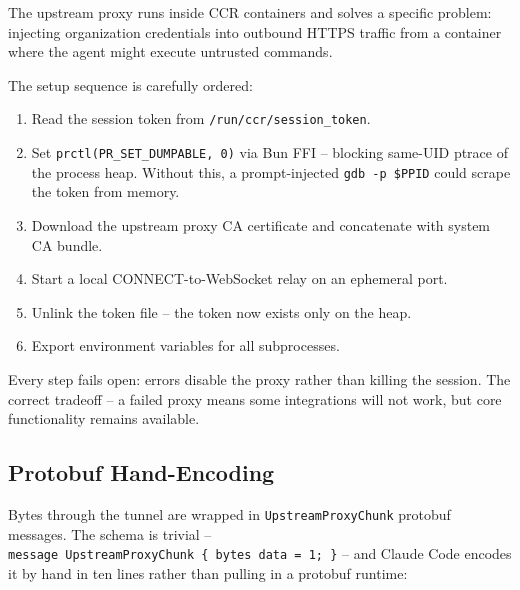 \documentclass[
  english,
  11pt,
  letterpaper,
]{book}
\providecommand{\tightlist}{%
  \setlength{\itemsep}{0pt}\setlength{\parskip}{0pt}}
\begin{document}
The upstream proxy runs inside CCR containers and solves a specific
problem: injecting organization credentials into outbound HTTPS traffic
from a container where the agent might execute untrusted commands.

The setup sequence is carefully ordered:

\begin{enumerate}
\def\labelenumi{\arabic{enumi}.}
\tightlist
\item
  Read the session token from \texttt{/run/ccr/session\_token}.
\item
  Set \texttt{prctl(PR\_SET\_DUMPABLE,\ 0)} via Bun FFI -- blocking
  same-UID ptrace of the process heap. Without this, a prompt-injected
  \texttt{gdb\ -p\ \$PPID} could scrape the token from memory.
\item
  Download the upstream proxy CA certificate and concatenate with system
  CA bundle.
\item
  Start a local CONNECT-to-WebSocket relay on an ephemeral port.
\item
  Unlink the token file -- the token now exists only on the heap.
\item
  Export environment variables for all subprocesses.
\end{enumerate}

Every step fails open: errors disable the proxy rather than killing the
session. The correct tradeoff -- a failed proxy means some integrations
will not work, but core functionality remains available.

\subsection{Protobuf Hand-Encoding}\label{protobuf-hand-encoding}

Bytes through the tunnel are wrapped in \texttt{UpstreamProxyChunk}
protobuf messages. The schema is trivial --
\texttt{message\ UpstreamProxyChunk\ \{\ bytes\ data\ =\ 1;\ \}} -- and
Claude Code encodes it by hand in ten lines rather than pulling in a
protobuf runtime:
\end{document}
